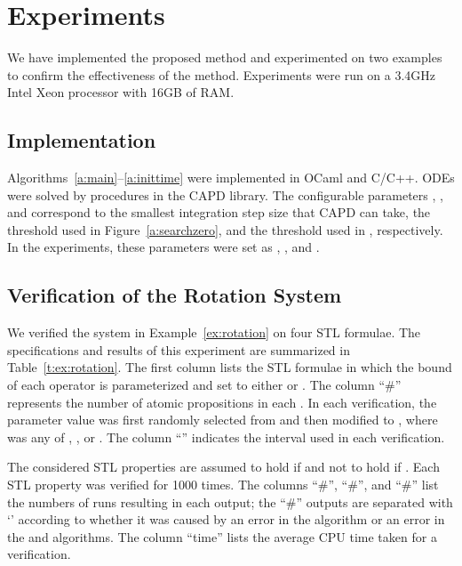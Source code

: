 \documentclass[paper]{ieice}
\begin{document}
\begin{table*}[t]
\begin{tabular}{l|c|c|c|r|r|r|r}
{\begin{tabular}{l}
		\end{tabular}}
		&   & \multirow{3}{*}{100} 
			  & 0               &  490 & 510 &   0+0 & 2.7s \\
		&   & &  &  352 & 477 &  74+97 & 2.7s \\
		& 5 & &  &    0 &   0 & 1000+0 & -- \.1em]
		\hline
	\end{tabular}
\end{table*}

\section{Experiments}
\label{s:ex}

We have implemented the proposed method and experimented on two examples to confirm the effectiveness of the method.
Experiments were run on a 3.4GHz Intel Xeon processor with 16GB of RAM.

\subsection{Implementation}
\label{s:impl}

Algorithms~\ref{a:main}--\ref{a:inittime} were implemented in OCaml and C/C++.
ODEs were solved by procedures in the CAPD library.
The configurable parameters , , and  correspond to the smallest integration step size that CAPD can take, the threshold used in Figure~\ref{a:searchzero}, and the threshold used in , respectively.
In the experiments, these parameters were set as , , and .


\subsection{Verification of the Rotation System}



We verified the system in Example~\ref{ex:rotation} on four STL formulae.
The specifications and results of this experiment are summarized in  Table~\ref{t:ex:rotation}.
The first column lists the STL formulae in which the bound  of each  operator is parameterized and set to either  or .
The column ``\#'' represents the number of atomic propositions in each .
In each verification, the parameter value  was first randomly selected from  and then modified to , where  was any of , , or .
The column ``'' indicates the interval used in each verification.

The considered STL properties are assumed to hold if  and not to hold if .
Each STL property was verified for 1000 times.
The columns ``\#'', ``\#'', and ``\#'' list the numbers of runs resulting in each output; the ``\#'' outputs are separated with `' according to whether it was caused by an error in the  algorithm or an error in the  and  algorithms.
The column ``time'' lists the average CPU time taken for a  verification.
\end{document}
